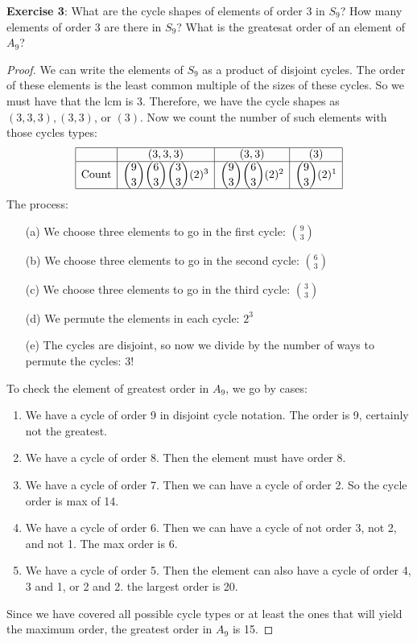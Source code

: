 \documentclass{article}
\begin{document}
\textbf{Exercise 3}: What are the cycle shapes of elements of order 3 in $S_{9}$? How many elements of order 3 are there in $S_{9}$? What is the greatesat order of an element of $A_{9}$?
\begin{proof}
	We can write the elements of $S_{9}$ as a product of disjoint cycles. The order of these elements is the least common multiple of the sizes of these cycles. So we must have that the lcm is 3. Therefore, we have the cycle shapes as $(3, 3, 3), (3, 3)$, or $(3)$. Now we count the number of such elements with those cycles types:
	\begin{align*}
		\begin{array}{ | c | c | c | c | }
			\hline
			 & (3, 3, 3) & (3, 3) & (3) \\
			\hline
			\text{Count} & \dbinom{9}{3}\dbinom{6}{3}\dbinom{3}{3}(2)^{3} & \dbinom{9}{3}\dbinom{6}{3}(2)^{2} & \dbinom{9}{3}(2)^{1} \\
			\hline
		\end{array}
	\end{align*}
    The process:
    \begin{enumerate}
        \item [(a)] We choose three elements to go in the first cycle: $\binom{9}{3}$

        \item [(b)] We choose three elements to go in the second cycle: $\binom{6}{3}$

        \item [(c)] We choose three elements to go in the third cycle: $\binom{3}{3}$

        \item [(d)] We permute the elements in each cycle: $2^{3}$

        \item [(e)] The cycles are disjoint, so now we divide by the number of ways to permute the cycles: $3!$
    \end{enumerate}

	To check the element of greatest order in $A_{9}$, we go by cases:
	\begin{enumerate}
		\item We have a cycle of order 9 in disjoint cycle notation. The order is 9, certainly not the greatest.

		\item We have a cycle of order 8. Then the element must have order 8.

		\item We have a cycle of order 7. Then we can have a cycle of order 2. So the cycle order is max of 14.

		\item We have a cycle of order 6. Then we can have a cycle of not order 3, not 2, and not 1. The max order is 6.

		\item We have a cycle of order 5. Then the element can also have a cycle of order 4, 3 and 1, or 2 and 2. the largest order is 20. 
	\end{enumerate}
	Since we have covered all possible cycle types or at least the ones that will yield the maximum order, the greatest order in $A_{9}$ is 15.
\end{proof}
\end{document}
